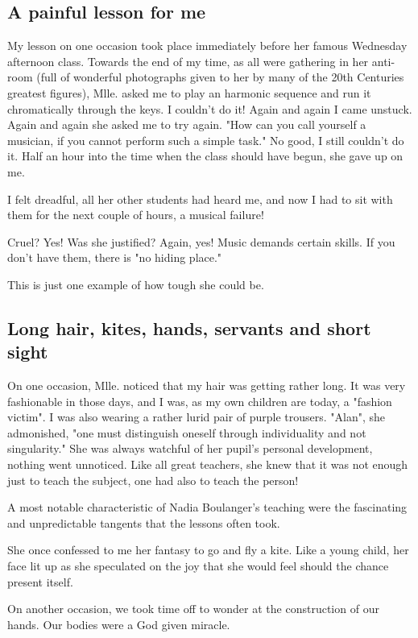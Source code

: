 \documentclass{article}
\begin{document}
\subsection{A painful lesson for me}

My lesson on one occasion took place immediately before her famous Wednesday afternoon class.
Towards the end of my time, as all were gathering in her anti-room (full of wonderful photographs given to her by many of the 20th Centuries greatest figures), Mlle. asked me to play an harmonic sequence and run it chromatically through the keys.
I couldn't do it!
Again and again I came unstuck.
Again and again she asked me to try again.
"How can you call yourself a musician, if you cannot perform such a simple task."
No good, I still couldn't do it.
Half an hour into the time when the class should have begun, she gave up on me.

I felt dreadful, all her other students had heard me, and now I had to sit with them for the next couple of hours, a musical failure!

Cruel?
Yes!
Was she justified?
Again, yes!
Music demands certain skills.
If you don't have them, there is "no hiding place."

This is just one example of how tough she could be.

\subsection{Long hair, kites, hands, servants and short sight}

On one occasion, Mlle. noticed that my hair was getting rather long.
It was very fashionable in those days, and I was, as my own children are today, a "fashion victim".
I was also wearing a rather lurid pair of purple trousers.
"Alan", she admonished, "one must distinguish oneself through individuality and not singularity."
She was always watchful of her pupil's personal development, nothing went unnoticed.
Like all great teachers, she knew that it was not enough just to teach the subject, one had also to teach the person!

A most notable characteristic of Nadia Boulanger's teaching were the fascinating and unpredictable tangents that the lessons often took.

She once confessed to me her fantasy to go and fly a kite.
Like a young child, her face lit up as she speculated on the joy that she would feel should the chance present itself.

On another occasion, we took time off to wonder at the construction of our hands.
Our bodies were a God given miracle.
\end{document}
